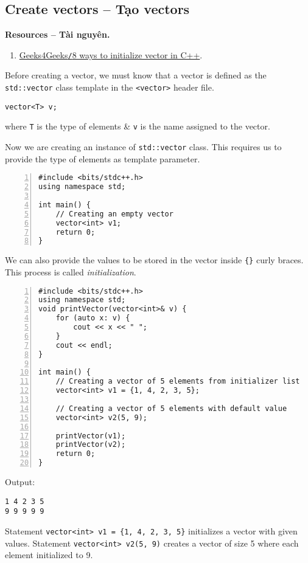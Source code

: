 \documentclass{article}
\begin{document}

\subsection{Create vectors -- Tạo vectors}
\textbf{\textsf{Resources -- Tài nguyên.}}
\begin{enumerate}
	\item \href{https://www.geeksforgeeks.org/initialize-a-vector-in-cpp-different-ways/}{Geeks4Geeks{\tt/}8 ways to initialize vector in C++}.
\end{enumerate}
Before creating a vector, we must know that a vector is defined as the {\tt std::vector} class template in the {\tt<vector>} header file.
\begin{verbatim}
vector<T> v;
\end{verbatim}
where {\tt T} is the type of elements \& {\tt v} is the name assigned to the vector.

Now we are creating an instance of {\tt std::vector} class. This requires us to provide the type of elements as template parameter.
\begin{Verbatim}[numbers=left,xleftmargin=5mm]
#include <bits/stdc++.h>
using namespace std;

int main() {
    // Creating an empty vector
    vector<int> v1;	
    return 0;
}
\end{Verbatim}
We can also provide the values to be stored in the vector inside {\tt\{\}} curly braces. This process is called {\it initialization}.
\begin{Verbatim}[numbers=left,xleftmargin=5mm]
#include <bits/stdc++.h>
using namespace std;
void printVector(vector<int>& v) {
    for (auto x: v) {
        cout << x << " ";
    }
    cout << endl;
}

int main() {	
    // Creating a vector of 5 elements from initializer list
    vector<int> v1 = {1, 4, 2, 3, 5};
	
    // Creating a vector of 5 elements with default value
	vector<int> v2(5, 9);
	
    printVector(v1);
    printVector(v2);
	return 0;
}
\end{Verbatim}
Output:
\begin{verbatim}
1 4 2 3 5 
9 9 9 9 9
\end{verbatim}
Statement \verb|vector<int> v1 = {1, 4, 2, 3, 5}| initializes a vector with given values. Statement \verb|vector<int> v2(5, 9)| creates a vector of size 5 where each element initialized to 9.
\end{document}
